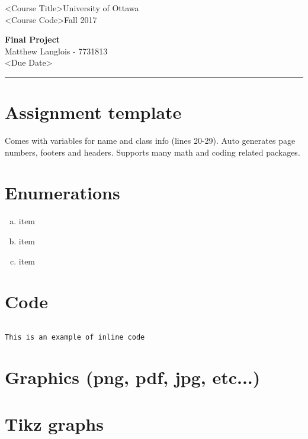\documentclass[fleqn, 12pt]{article}
\newcommand{\university}{University of Ottawa}
\newcommand{\name}{Matthew Langlois}
\newcommand{\studentNumber}{7731813}
\newcommand{\semester}{Fall 2017}
\newcommand{\assignmentType}{Final Project}
\newcommand{\assignmentNumber}{}
\newcommand{\dueDate}{<Due Date>}
\newcommand{\courseCode}{<Course Code>}
\newcommand{\courseTitle}{<Course Title>}
\newcommand{\essayTitle}{<Title>} %
\newcommand{\essaySubtitle}{<subtitle>} %
\newcommand{\essayAbstract}{} %
\newcommand{\code}[2]{\colorbox{codegray}{\texttt{#2}}}
\newcommand{\codefile}{\inputminted}
\newcommand{\beginassignemnt}{
    \newlength\tindent
    \setlength{\tindent}{\parindent}
    \setlength{\parindent}{0pt}

    \thispagestyle{assignment}
    \noindent
    \courseTitle \hfill \university\\
    \courseCode \hfill \semester
    \begin{center}
        \textbf{\assignmentType\text{ }\ifdefempty{\assignmentNumber}{}{\#}\assignmentNumber}\\
        \name \hspace{1pt} - \studentNumber\\
        \dueDate\\
    \end{center}
    \vspace{6pt}
    \hrule
    \vspace{1.5\headsep}
}
\newcommand{\beginessay}{
    \nocite{*}

    \pagestyle{frontmatter}
    \pagenumbering{roman}

    \begin{center}
        \normalsize
        \textsc{\university}\\[5cm]
        \LARGE \textbf{\MakeUppercase{\essayTitle}}\\[0.5cm]
        \large \text{ }\essaySubtitle\text{ }\\[10cm] %
        \normalsize
        \textsc{\name}\\
        \textsc{\studentNumber}\\
        \textsc{\courseCode}\\
        \textsc{\semester}\\
        \textsc{\dueDate}
    \end{center}
    \thispagestyle{empty}

    \newpage
    \tableofcontents
    \newpage

    \iftotalfigures
        \addcontentsline{toc}{section}{\listfigurename}
        \listoffigures
    \fi
    \iftotaltables
        \addcontentsline{toc}{section}{\listtablename}
        \listoftables
    \fi

    \ifdefempty{\essayAbstract}{}{
        \newpage
        \addcontentsline{toc}{section}{Abstract}
        \begin{abstract}
            \essayAbstract
        \end{abstract}

    }
    \label{EndFrontMatter}
    \newpage

    \pagenumbering{arabic}
    \pagestyle{body}
}
\begin{document}
\beginassignemnt


\section*{Assignment template}

Comes with variables for name and class info (lines 20-29). Auto generates page numbers, footers and headers. Supports many math and coding related packages.

\section*{Enumerations}

\begin{enumerate}[a)]
    \item item
    \item item
    \item item
\end{enumerate}

\section*{Code}

\codefile{javascript}{code/sample.js}

\code{text}{This is an example of inline code}

\section*{Graphics (png, pdf, jpg, etc...)}


\newpage

\section*{Tikz graphs}
\end{document}

